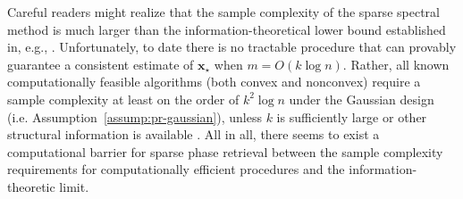  
\begin{remark}
Careful readers might realize that the sample complexity of the sparse spectral method is much larger than the information-theoretical lower bound established in, e.g., \cite{eldar2014phase}. 
Unfortunately, to date there is no tractable  procedure that can provably guarantee a consistent estimate of $\bm{x}_\star$ when $m = O( k\log n) $. Rather, all known computationally feasible algorithms (both convex and nonconvex)  require a sample complexity at least on the order of $k^2 \log n$ under the Gaussian design (i.e. Assumption~\ref{assump:pr-gaussian}), unless $k$ is sufficiently large or other structural information is available \citep{li2013sparse,oymak2012simultaneously,chen2015exact,cai2016optimal,jagatap2017fast}.  All in all, there seems to exist a computational barrier for sparse phase retrieval between the sample complexity requirements for computationally efficient procedures and the information-theoretic limit. 
\end{remark}

 